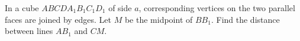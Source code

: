 In a cube $ABCDA_1B_1C_1D_1$ of side $a$, corresponding vertices on the two parallel faces are joined by edges. Let $M$ be the midpoint of $BB_1$. Find the distance between lines $AB_1$ and $CM$.
